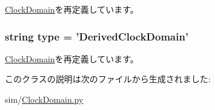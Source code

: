 \hyperlink{classClockDomain_1_1ClockDomain_a17da7064bc5c518791f0c891eff05fda}{ClockDomain}を再定義しています。\hypertarget{classClockDomain_1_1DerivedClockDomain_acce15679d830831b0bbe8ebc2a60b2ca}{
\subsubsection[{type}]{\setlength{\rightskip}{0pt plus 5cm}string {\bf type} = '{\bf DerivedClockDomain}'}}
\label{classClockDomain_1_1DerivedClockDomain_acce15679d830831b0bbe8ebc2a60b2ca}


\hyperlink{classClockDomain_1_1ClockDomain_acce15679d830831b0bbe8ebc2a60b2ca}{ClockDomain}を再定義しています。

このクラスの説明は次のファイルから生成されました:\begin{DoxyCompactItemize}
\item 
sim/\hyperlink{ClockDomain_8py}{ClockDomain.py}\end{DoxyCompactItemize}
